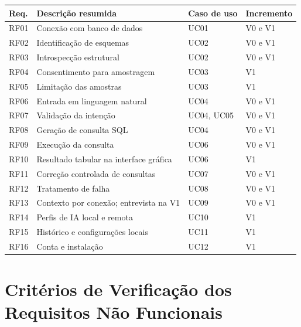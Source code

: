 \begin{apendicesenv}
\begin{quadro}[htb]
    \caption{Rastreabilidade dos requisitos funcionais}
    \label{qua:rastreabilidade}
    \begin{tabular}{|p{1.4cm}|p{7.2cm}|p{2.2cm}|p{2.8cm}|}
        \hline
        \textbf{Req.} & \textbf{Descrição resumida} & \textbf{Caso de uso} & \textbf{Incremento} \\ \hline
        RF01 & Conexão com banco de dados & UC01 & V0 e V1 \\ \hline
        RF02 & Identificação de esquemas & UC02 & V0 e V1 \\ \hline
        RF03 & Introspecção estrutural & UC02 & V0 e V1 \\ \hline
        RF04 & Consentimento para amostragem & UC03 & V1 \\ \hline
        RF05 & Limitação das amostras & UC03 & V1 \\ \hline
        RF06 & Entrada em linguagem natural & UC04 & V0 e V1 \\ \hline
        RF07 & Validação da intenção & UC04, UC05 & V0 e V1 \\ \hline
        RF08 & Geração de consulta SQL & UC04 & V0 e V1 \\ \hline
        RF09 & Execução da consulta & UC06 & V0 e V1 \\ \hline
        RF10 & Resultado tabular na interface gráfica & UC06 & V1 \\ \hline
        RF11 & Correção controlada de consultas & UC07 & V0 e V1 \\ \hline
        RF12 & Tratamento de falha & UC08 & V0 e V1 \\ \hline
        RF13 & Contexto por conexão; entrevista na V1 & UC09 & V0 e V1 \\ \hline
        RF14 & Perfis de IA local e remota & UC10 & V1 \\ \hline
        RF15 & Histórico e configurações locais & UC11 & V1 \\ \hline
        RF16 & Conta e instalação & UC12 & V1 \\ \hline
    \end{tabular}
\end{quadro}

\section{Critérios de Verificação dos Requisitos Não Funcionais}
\label{ap:criterios-rnf}


\end{apendicesenv}
